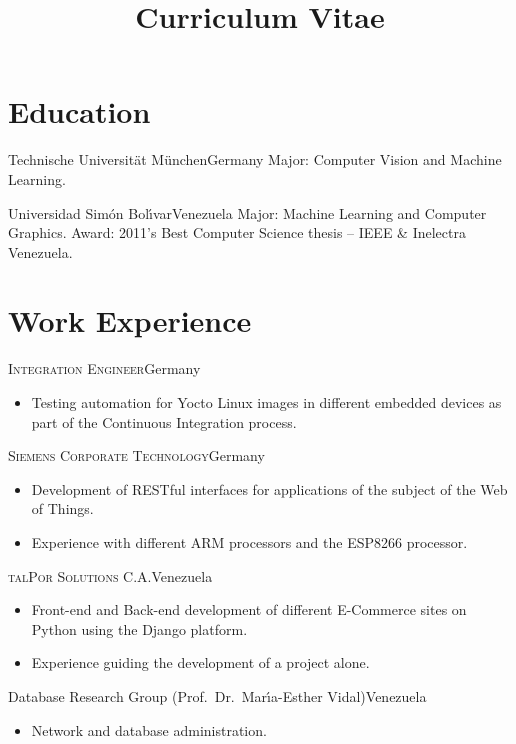 \documentclass[10pt]{moderncv}
\title{Curriculum Vitae}
\begin{document}
\maketitle

\section{Education}

  {Technische Universit\"at M\"unchen}{Germany}{}{%
    Major: Computer Vision and Machine Learning.
  }

  {Universidad Sim\'on Bol\'{\i}var}{Venezuela}{}{%
    Major: Machine Learning and Computer Graphics.
    \newline
    Award: 2011's Best Computer Science thesis -- IEEE \& Inelectra Venezuela.
  }

\section{Work Experience}

{\textsc{Integration Engineer}}{Germany}{}{%
\begin{itemize}
    \item Testing automation for Yocto Linux images in different embedded 
      devices as part of the Continuous Integration process.
\end{itemize}
}

{\textsc{Siemens Corporate Technology}}{Germany}{}{%
\begin{itemize}
  \item Development of RESTful interfaces for applications of the 
    subject of the Web of Things.
  \item Experience with different ARM processors and the ESP8266 processor.
\end{itemize}
}

{\textsc{talPor Solutions C.A.}}{Venezuela}{}{%
\begin{itemize}
  \item Front-end and Back-end development of different E-Commerce sites
    on Python using the Django platform.
  \item Experience guiding the development of a project alone.
\end{itemize}
}

{Database Research Group (Prof.\ Dr.\ Mar\'{\i}a-Esther Vidal)}{Venezuela}{}{%
\begin{itemize}
  \item Network and database administration.
\end{itemize}
}
\end{document}
